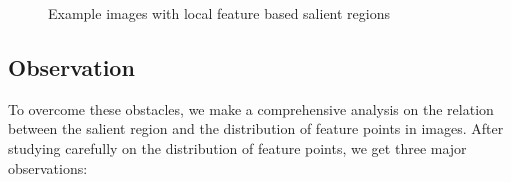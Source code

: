 \begin{figure}[!t]
	\centering
	\hfil
	\caption{Example images with local feature based salient regions}
	\label{fig:observations}
\end{figure}

\subsection{Observation}
\label{subsec:observation}

To overcome these obstacles, we make a comprehensive analysis on the relation between the salient region and the distribution of feature points  in images. After studying carefully on the distribution of feature points, we get three major observations:



